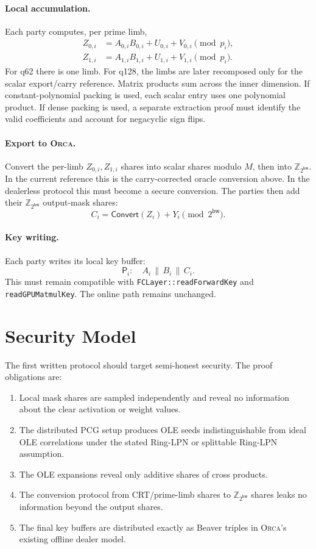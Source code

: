 \documentclass[11pt]{article}
\newcommand{\Z}{\mathbb{Z}}
\newcommand{\Party}{\mathsf{P}}
\newcommand{\modtwo}{\Z_{2^{\mathsf{bw}}}}
\newcommand{\Orca}{\textsc{Orca}}
\begin{document}
\paragraph{Local accumulation.}
Each party computes, per prime limb,
\[
\begin{aligned}
  Z_{0,i} &= A_{0,i}B_{0,i} + U_{0,i} + V_{0,i} \pmod {p_i},\\
  Z_{1,i} &= A_{1,i}B_{1,i} + U_{1,i} + V_{1,i} \pmod {p_i}.
\end{aligned}
\]
For q62 there is one limb. For q128, the limbs are later recomposed only for
the scalar export/carry reference.
Matrix products sum across the inner dimension. If constant-polynomial
packing is used, each scalar entry uses one polynomial product. If dense
packing is used, a separate extraction proof must identify the valid
coefficients and account for negacyclic sign flips.

\paragraph{Export to \Orca{}.}
Convert the per-limb \(Z_{0,i},Z_{1,i}\) shares into scalar shares modulo
\(M\), then into \(\modtwo\). In the current reference this is the
carry-corrected oracle conversion above. In the dealerless protocol this must
become a secure conversion. The parties then add their \(\modtwo\)
output-mask shares:
\[
  C_i = \mathsf{Convert}(Z_i) + Y_i \pmod {2^{\mathsf{bw}}}.
\]

\paragraph{Key writing.}
Each party writes its local key buffer:
\[
  \Party_i: \quad A_i \,\|\, B_i \,\|\, C_i.
\]
This must remain compatible with \texttt{FCLayer::readForwardKey} and
\texttt{readGPUMatmulKey}. The online path remains unchanged.

\section{Security Model}

The first written protocol should target semi-honest security. The proof
obligations are:
\begin{enumerate}[leftmargin=*]
  \item Local mask shares are sampled independently and reveal no information
  about the clear activation or weight values.
  \item The distributed PCG setup produces OLE seeds indistinguishable from
  ideal OLE correlations under the stated Ring-LPN or splittable Ring-LPN
  assumption.
  \item The OLE expansions reveal only additive shares of cross products.
  \item The conversion protocol from CRT/prime-limb shares to \(\modtwo\)
  shares leaks no information beyond the output shares.
  \item The final key buffers are distributed exactly as Beaver triples in
  \Orca{}'s existing offline dealer model.
\end{enumerate}
\end{document}
